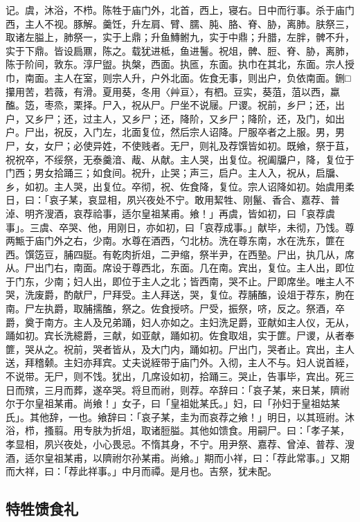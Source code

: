 \documentclass[]{article}
\begin{document}
记。虞，沐浴，不栉。陈牲于庙门外，北首，西上，寝右。日中而行事。杀于庙门西，主人不视。豚解。羹饪，升左肩、臂、臑、肫、胳、脊、胁，离肺。肤祭三，取诸左膉上，肺祭一，实于上鼎；升鱼鱄鲋九，实于中鼎；升腊，左胖，髀不升，实于下鼎。皆设扃鼏，陈之。载犹进柢，鱼进鬐。祝俎，髀、脰、脊、胁，离肺，陈于阶间，敦东。淳尸盥。执槃，西面。执匜，东面。执巾在其北，东面。宗人授巾，南面。主人在室，则宗人升，户外北面。佐食无事，则出户，负依南面。鉶□攥用苦，若薇，有滑。夏用葵，冬用〈艸亘〉，有柶。豆实，葵菹，菹以西，蠃醢。笾，枣烝，栗择。尸入，祝从尸。尸坐不说屦。尸谡。祝前，乡尸；还，出户，又乡尸；还，过主人，又乡尸；还，降阶，又乡尸；降阶，还，及门，如出户。尸出，祝反，入门左，北面复位，然后宗人诏降。尸服卒者之上服。男，男尸，女，女尸；必使异姓，不使贱者。无尸，则礼及荐馔皆如初。既飨，祭于苴，祝祝卒，不绥祭，无泰羹湆、胾、从献。主人哭，出复位。祝阖牖户，降，复位于门西；男女拾踊三；如食间。祝升，止哭；声三，启户。主人入，祝从，启牖、乡，如初。主人哭，出复位。卒彻，祝、佐食降，复位。宗人诏降如初。始虞用柔日，曰：「哀子某，哀显相，夙兴夜处不宁。敢用絜牲、刚鬣、香合、嘉荐、普淖、明齐溲酒，哀荐祫事，适尔皇祖某甫。飨！」再虞，皆如初，曰「哀荐虞事」。三虞、卒哭、他，用刚日，亦如初，曰「哀荐成事。」献毕，未彻，乃饯。尊两甒于庙门外之右，少南。水尊在酒西，勺北枋。洗在尊东南，水在洗东，篚在西。馔笾豆，脯四脡。有乾肉折俎，二尹缩，祭半尹，在西塾。尸出，执几从，席从。尸出门右，南面。席设于尊西北，东面。几在南。宾出，复位。主人出，即位于门东，少南；妇人出，即位于主人之北；皆西南，哭不止。尸即席坐。唯主人不哭，洗废爵，酌献尸，尸拜受。主人拜送，哭，复位。荐脯醢，设俎于荐东，朐在南。尸左执爵，取脯擩醢，祭之。佐食授哜。尸受，振祭，哜，反之。祭酒，卒爵，奠于南方。主人及兄弟踊，妇人亦如之。主妇洗足爵，亚献如主人仪，无从，踊如初。宾长洗繶爵，三献，如亚献，踊如初。佐食取俎，实于篚。尸谡，从者奉篚，哭从之。祝前，哭者皆从，及大门内，踊如初。尸出门，哭者止。宾出，主人送，拜稽颡。主妇亦拜宾。丈夫说絰带于庙门外。入彻，主人不与。妇人说首絰，不说带。无尸，则不饯。犹出，几席设如初，拾踊三。哭止，告事毕，宾出。死三日而殡，三月而葬，遂卒哭。将旦而祔，则荐。卒辞曰：「哀子某，来日某，隮祔尔于尔皇祖某甫。尚飨！」女子，曰「皇祖妣某氏。」妇，曰「孙妇于皇祖姑某氏」。其他辞，一也。飨辞曰：「哀子某，圭为而哀荐之飨！」明日，以其班祔。沐浴，栉，搔翦。用专肤为折俎，取诸脰膉。其他如馈食。用嗣尸。曰：「孝子某，孝显相，夙兴夜处，小心畏忌。不惰其身，不宁。用尹祭、嘉荐、曾淖、普荐、溲酒，适尔皇祖某甫，以隮祔尔孙某甫。尚飨。」期而小祥，曰：「荐此常事。」又期而大祥，曰：「荐此祥事。」中月而禫。是月也。吉祭，犹未配。

\hypertarget{header-n68}{%
\subsection{特牲馈食礼}\label{header-n68}}
\end{document}

